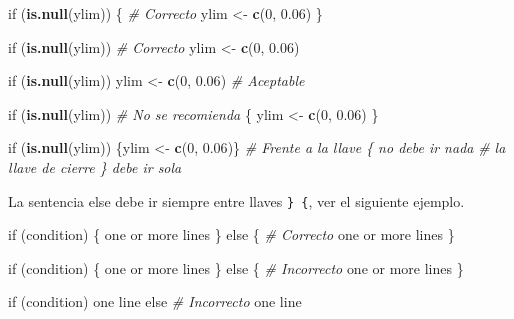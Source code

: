 \documentclass[10pt,]{krantz}
\makeatletter
\newenvironment{Shaded}{\begin{snugshade}}{\end{snugshade}}
\newcommand{\KeywordTok}[1]{\textcolor[rgb]{0.13,0.29,0.53}{\textbf{{#1}}}}
\newcommand{\DecValTok}[1]{\textcolor[rgb]{0.00,0.00,0.81}{{#1}}}
\newcommand{\FloatTok}[1]{\textcolor[rgb]{0.00,0.00,0.81}{{#1}}}
\newcommand{\StringTok}[1]{\textcolor[rgb]{0.31,0.60,0.02}{{#1}}}
\newcommand{\CommentTok}[1]{\textcolor[rgb]{0.56,0.35,0.01}{\textit{{#1}}}}
\newcommand{\NormalTok}[1]{{#1}}
\newenvironment{kframe}{%
\medskip{}
\setlength{\fboxsep}{.8em}
 \def\at@end@of@kframe{}%
 \ifinner\ifhmode%
  \def\at@end@of@kframe{\end{minipage}}%
  \begin{minipage}{\columnwidth}%
 \fi\fi%
 \def\FrameCommand##1{\hskip\@totalleftmargin \hskip-\fboxsep
 \colorbox{shadecolor}{##1}\hskip-\fboxsep
     \hskip-\linewidth \hskip-\@totalleftmargin \hskip\columnwidth}%
 \MakeFramed {\advance\hsize-\width
   \@totalleftmargin\z@ \linewidth\hsize
   \@setminipage}}%
 {\par\unskip\endMakeFramed%
 \at@end@of@kframe}
\renewenvironment{Shaded}{\begin{kframe}}{\end{kframe}}
\makeatother
\begin{document}
\begin{Shaded}
\begin{Highlighting}[]
\NormalTok{if (}\KeywordTok{is.null}\NormalTok{(ylim)) \{                     }\CommentTok{# Correcto}
  \NormalTok{ylim <-}\StringTok{ }\KeywordTok{c}\NormalTok{(}\DecValTok{0}\NormalTok{, }\FloatTok{0.06}\NormalTok{)}
\NormalTok{\}}

\NormalTok{if (}\KeywordTok{is.null}\NormalTok{(ylim))                       }\CommentTok{# Correcto}
  \NormalTok{ylim <-}\StringTok{ }\KeywordTok{c}\NormalTok{(}\DecValTok{0}\NormalTok{, }\FloatTok{0.06}\NormalTok{)}

\NormalTok{if (}\KeywordTok{is.null}\NormalTok{(ylim)) ylim <-}\StringTok{ }\KeywordTok{c}\NormalTok{(}\DecValTok{0}\NormalTok{, }\FloatTok{0.06}\NormalTok{)    }\CommentTok{# Aceptable}

\NormalTok{if (}\KeywordTok{is.null}\NormalTok{(ylim))                       }\CommentTok{# No se recomienda}
\NormalTok{\{        }
  \NormalTok{ylim <-}\StringTok{ }\KeywordTok{c}\NormalTok{(}\DecValTok{0}\NormalTok{, }\FloatTok{0.06}\NormalTok{)}
\NormalTok{\}}
    
\NormalTok{if (}\KeywordTok{is.null}\NormalTok{(ylim)) \{ylim <-}\StringTok{ }\KeywordTok{c}\NormalTok{(}\DecValTok{0}\NormalTok{, }\FloatTok{0.06}\NormalTok{)\}}
\CommentTok{# Frente a la llave \{ no debe ir nada}
\CommentTok{# la llave de cierre \} debe ir sola}
\end{Highlighting}
\end{Shaded}

La sentencia else debe ir siempre entre llaves \texttt{\}\ \{}, ver el
siguiente ejemplo.

\begin{Shaded}
\begin{Highlighting}[]
\NormalTok{if (condition) \{         }
  \NormalTok{one or more lines}
\NormalTok{\} else \{                 }\CommentTok{# Correcto}
  \NormalTok{one or more lines}
\NormalTok{\}}


\NormalTok{if (condition) \{         }
  \NormalTok{one or more lines}
\NormalTok{\}}
\NormalTok{else \{                   }\CommentTok{# Incorrecto}
  \NormalTok{one or more lines}
\NormalTok{\}}


\NormalTok{if (condition)           }
  \NormalTok{one line}
\NormalTok{else                     }\CommentTok{# Incorrecto}
  \NormalTok{one line}
\end{Highlighting}
\end{Shaded}
\end{document}
